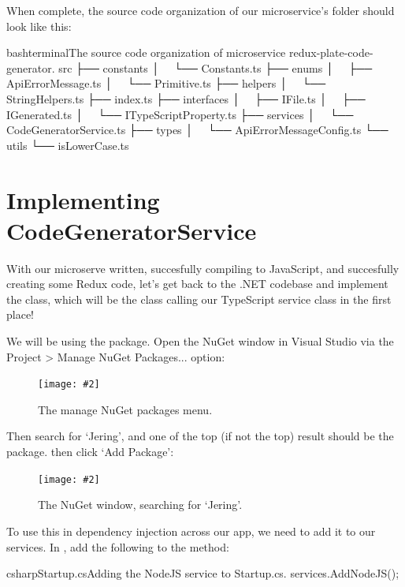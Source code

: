 \documentclass[paper=6in:9in,pagesize=pdftex,headinclude=on,footinclude=on,12pt,twoside]{scrbook}
\newcommand{\standardfigure}[3]{\begin{figure}[H]\begin{center}\texttt{[image: \#2]}\caption{#3}\label{fig:#2}\end{center}\end{figure}}
\begin{document}

When complete, the source code organization of our microservice's  folder should look like this:

\begin{codeInput}{bash}{terminal}{The source code organization of microservice redux-plate-code-generator.}
src
├── constants
│   └── Constants.ts
├── enums
│   ├── ApiErrorMessage.ts
│   └── Primitive.ts
├── helpers
│   └── StringHelpers.ts
├── index.ts
├── interfaces
│   ├── IFile.ts
│   ├── IGenerated.ts
│   └── ITypeScriptProperty.ts
├── services
│   └── CodeGeneratorService.ts
├── types
│   └── ApiErrorMessageConfig.ts
└── utils
    └── isLowerCase.ts
\end{codeInput}

\section{Implementing CodeGeneratorService}

With our microserve written, succesfully compiling to JavaScript, and succesfully creating some Redux code, let's get back to the .NET codebase and implement the  class, which will be the class calling our TypeScript service class in the first place!


We will be using the  package. Open the NuGet window in Visual Studio via the Project > Manage NuGet Packages... option:

\standardfigure{\textwidth}{backend/manage-nuget-packages}{The manage NuGet packages menu.}

Then search for `Jering', and one of the top (if not the top) result should be the  package. then click `Add Package':

\standardfigure{\textwidth}{backend/jering-package}{The NuGet window, searching for `Jering'.}

To use this in dependency injection across our app, we need to add it to our services. In , add the following to the  method:

\begin{codeInput}{csharp}{Startup.cs}{Adding the NodeJS service to Startup.cs.}
services.AddNodeJS();
\end{codeInput}
\end{document}
